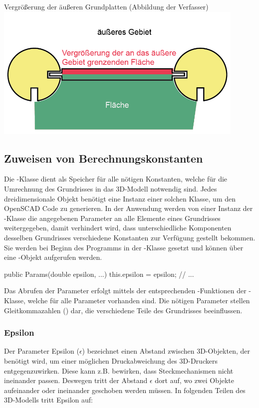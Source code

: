 \begin{Bild}{Vergrößerung der äußeren Grundplatten (Abbildung der Verfasser)}
	\includegraphics[width=120mm]{Bilder/GrundplatteVergroesserung-08}
\end{Bild}

\subsection{Zuweisen von Berechnungskonstanten}
\label{params}
Die -Klasse dient als Speicher für alle nötigen Konstanten, welche für die Umrechnung des Grundrisses in das 3D-Modell notwendig sind.
Jedes dreidimensionale Objekt benötigt eine Instanz einer solchen Klasse, um den OpenSCAD Code zu generieren.
In der Anwendung werden von einer Instanz der -Klasse die angegebenen Parameter an alle Elemente eines Grundrisses weitergegeben, damit verhindert wird, dass unterschiedliche Komponenten desselben Grundrisses verschiedene Konstanten zur Verfügung gestellt bekommen.
Sie werden bei Beginn des Programms in der -Klasse gesetzt und können über eine -Objekt aufgerufen werden. \\

\begin{code}
	public Params(double epsilon, ...){
		this.epsilon = epsilon;
		// ...
	}
\end{code}

Das Abrufen der Parameter erfolgt mittels der entsprechenden -Funktionen der -Klasse, welche für alle Parameter vorhanden sind. 
Die nötigen Parameter stellen Gleitkommazahlen () dar, die verschiedene Teile des Grundrisses beeinflussen. 

\subsubsection{Epsilon}
Der Parameter Epsilon ({\Large$\epsilon$}) bezeichnet einen Abstand zwischen 3D-Objekten, der benötigt wird, um einer möglichen Druckabweichung des 3D-Druckers entgegenzuwirken.
Diese kann z.B. bewirken, dass Steckmechanismen nicht ineinander passen.
Deswegen tritt der Abstand {\Large$\epsilon$} dort auf, wo zwei Objekte aufeinander oder ineinander geschoben werden müssen.
In folgenden Teilen des 3D-Modells tritt Epsilon auf:

